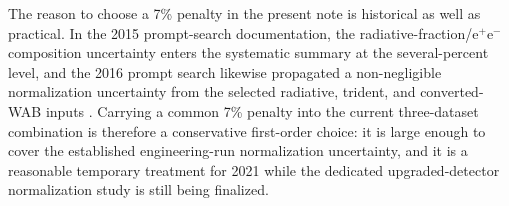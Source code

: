 The reason to choose a 7\% penalty in the present note is historical as well as
practical. In the 2015 prompt-search documentation, the radiative-fraction/e$^+$e$^-$
composition uncertainty enters the systematic summary at the several-percent level, and
the 2016 prompt search likewise propagated a non-negligible normalization uncertainty
from the selected radiative, trident, and converted-WAB inputs
\cite{HPS2015InternalNote,HPS2016PromptLong}. Carrying a common 7\% penalty into the
current three-dataset combination is therefore a conservative first-order choice: it is
large enough to cover the established engineering-run normalization uncertainty, and it
is a reasonable temporary treatment for 2021 while the dedicated upgraded-detector
normalization study is still being finalized.
